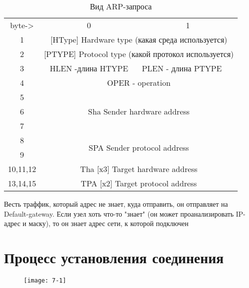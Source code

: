 \documentclass[a4paper,10pt]{article}
\begin{document}
	\begin{table}[h]
		\begin{tabular}{ccl}
			byte-\textgreater{} & 0                                   & \multicolumn{1}{c}{1}                 \\
			1                   & \multicolumn{2}{c}{{[}HType{]} Hardware type (какая среда используется)}    \\
			2                   & \multicolumn{2}{c}{{[}PTYPE{]} Protocol type (какой протокол используется)} \\
			3                   & HLEN -длина HTYPE                   & PLEN - длина PTYPE                    \\
			4                   & \multicolumn{2}{c}{OPER - operation}                                        \\
			5                   & \multicolumn{2}{c}{\multirow{3}{*}{Sha Sender hardware address}}            \\
			6                   & \multicolumn{2}{c}{}                                                        \\
			7                   & \multicolumn{2}{c}{}                                                        \\
			8                   & \multicolumn{2}{c}{\multirow{2}{*}{SPA Sender protocol address}}            \\
			9                   & \multicolumn{2}{c}{}                                                        \\
			10,11,12            & \multicolumn{2}{c}{Tha {[}x3{]} Target hardware address}                    \\
			13,14,15            & \multicolumn{2}{c}{TPA {[}x2{]} Target protocol address}                   
		\end{tabular}
	\caption{Вид ARP-запроса}
	\end{table}

	Весть траффик, который адрес не знает, куда отправить, он отправляет на Default-gateway. Если узел хоть что-то "знает" (он может проанализировать IP-адрес и маску), то он знает адрес сети, к которой подключен
	
	\section{Процесс установления соединения}
	\begin{figure}[h]
		\texttt{[image: 7-1]}
	\end{figure}
	
\end{document}
